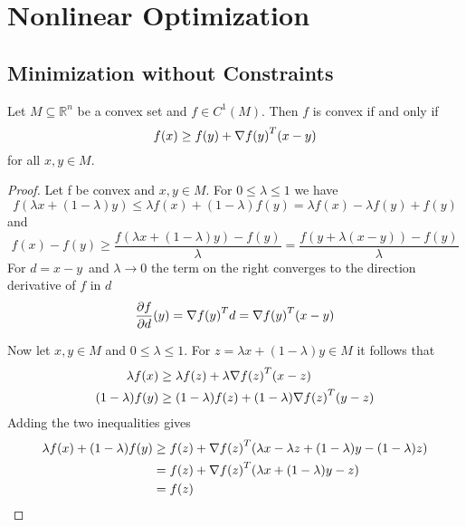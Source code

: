 
\newpage
\section{Nonlinear Optimization}
\subsection{Minimization without Constraints}


\begin{lemma}\label{thm:lemma_gradient_inequality}
    Let \(M \subseteq \mathbb{R}^n \) be a convex set and \(f \in C^1(M)\). Then \(f\) is convex if and only if
    \[
        f(x) \ge f(y) + \nabla {f(y)}^T (x - y)
    \]
    for all \(x, y \in M \).
\end{lemma}

\begin{proof}
    Let f be convex and \(x, y \in M\). For \( 0 \le \lambda \le 1 \) we have
    \[
        f(\lambda x + (1 - \lambda) y) \le \lambda f(x) + (1 - \lambda)f(y) =  \lambda f(x) - \lambda f(y) + f(y)
    \]
    and
    \[
        f(x) - f(y) \ge \frac{f(\lambda x + (1 - \lambda) y) - f(y)}{\lambda}
        = \frac{f(y + \lambda (x - y)) - f(y)}{\lambda}
    \]
    For \( d = x - y \)\ and \( \lambda \to 0 \) the term on the right converges to the direction derivative of \( f \)
    in \( d \)
    \[
        \frac{\partial f}{\partial d}(y) = \nabla{f(y)}^T d = \nabla{f(y)}^T (x - y)
    \]

    Now let \( x, y \in M \) and  \( 0 \le \lambda \le 1 \). For \( z = \lambda x + (1 - \lambda) y \in M \) 
    it follows that
    \[
        \begin{split}
            \lambda f(x) & \ge \lambda f(z) + \lambda \nabla {f(z)}^T (x - z) \\
            (1 - \lambda) f(y) & \ge (1 - \lambda) f(z) + (1 - \lambda) \nabla {f(z)}^T (y - z)
        \end{split}
    \]
    Adding the two inequalities gives
    \[
        \begin{split}
            \lambda f(x) + (1 - \lambda) f(y)
            & \ge f(z) + \nabla {f(z)}^T(\lambda x - \lambda z + (1- \lambda) y - (1-\lambda)z) \\
            & = f(z) + \nabla {f(z)}^T(\lambda x + (1- \lambda) y - z) \\
            & = f(z)
        \end{split}
    \]
\end{proof}
\bigskip


